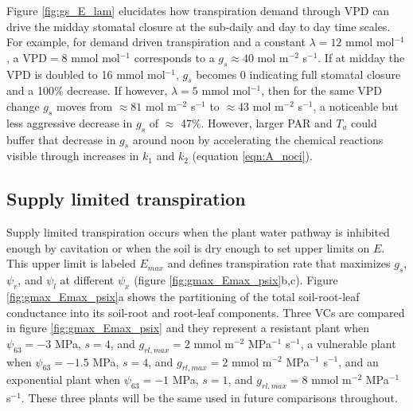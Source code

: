 \documentclass[utf8]{frontiersSCNS} %
\begin{document}
Figure \ref{fig:gs_E_lam} elucidates how transpiration demand through VPD can drive the midday stomatal closure at the sub-daily and day to day time scales. For example, for demand driven transpiration and a constant $\lambda=12$ mmol mol$^{-1}$, a VPD$=8$ mmol mol$^{-1}$ corresponds to a $g_s\approx 40$ mol m$^{-2}$ s$^{-1}$. If at midday the VPD is doubled to 16 mmol mol$^{-1}$, $g_s$ becomes 0 indicating full stomatal closure and a 100\% decrease. If however, $\lambda=5$ mmol mol$^{-1}$, then for the same VPD change $g_s$ moves from $\approx 81$ mol m$^{-2}$ s$^{-1}$ to $\approx 43$ mol m$^{-2}$ s$^{-1}$, a noticeable but less aggressive decrease in $g_s$ of $\approx$ 47\%. However, larger PAR and $T_a$ could buffer that decrease in $g_s$ around noon by accelerating the chemical reactions visible through increases in $k_1$ and $k_2$ (equation \ref{eqn:A_noci}).


\subsection{Supply limited transpiration}

Supply limited transpiration occurs when the plant water pathway is inhibited enough by cavitation or when the soil is dry enough to set upper limits on $E$. This upper limit is labeled $E_{max}$ and defines transpiration rate that maximizes $g_s$, $\psi_r$, and $\psi_l$ at different $\psi_x$ (figure \ref{fig:gmax_Emax_psix}b,c). Figure \ref{fig:gmax_Emax_psix}a shows the partitioning of the total soil-root-leaf conductance into its soil-root and root-leaf components. Three VCs are compared in figure \ref{fig:gmax_Emax_psix} and they represent a resistant plant when $\psi_{63} = -3$ MPa, $s=4$, and $g_{rl,max} = 2$ mmol m$^{-2}$ MPa$^{-1}$ s$^{-1}$, a vulnerable plant when $\psi_{63} = -1.5$ MPa, $s=4$, and $g_{rl,max} = 2$ mmol m$^{-2}$ MPa$^{-1}$ s$^{-1}$, and an exponential plant when $\psi_{63} = -1$ MPa, $s=1$, and $g_{rl,max} = 8$ mmol m$^{-2}$ MPa$^{-1}$ s$^{-1}$. These three plants will be the same used in future comparisons throughout.
\end{document}
